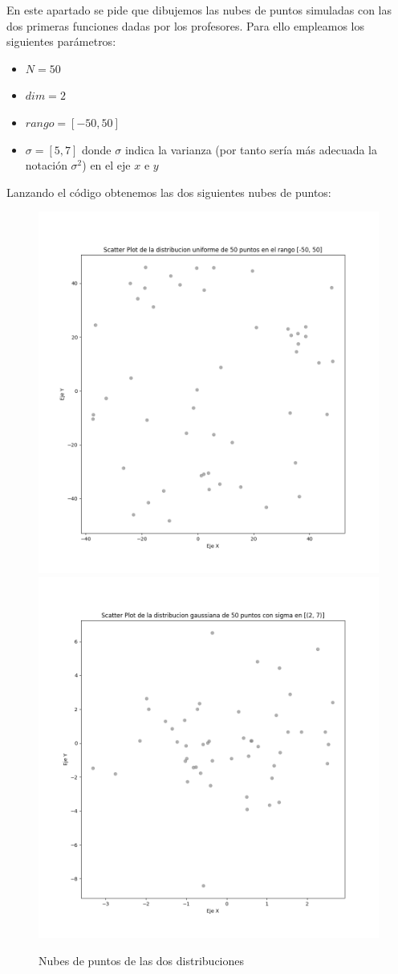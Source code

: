 \documentclass[11pt]{article}
\begin{document}
En este apartado se pide que dibujemos las nubes de puntos simuladas con las dos primeras funciones dadas por los profesores. Para ello empleamos los siguientes parámetros:

\begin{itemize}
    \item $N = 50$
    \item $dim = 2$
    \item $rango = [-50, 50]$
    \item $\sigma = [5, 7]$ donde $\sigma$ indica la varianza (por tanto sería más adecuada la notación $\sigma^2$) en el eje $x$ e $y$
\end{itemize}

Lanzando el código obtenemos las dos siguientes nubes de puntos:

\begin{figure}[h]
    \includegraphics[width=0.60 \textwidth]{nube_puntos_uniforme}
    \includegraphics[width=0.60 \textwidth]{nube_puntos_normal}
    \caption{Nubes de puntos de las dos distribuciones}
\end{figure}
\end{document}
